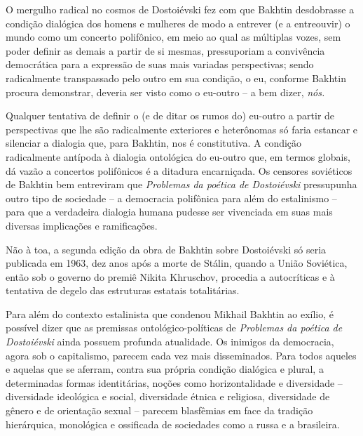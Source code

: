 O mergulho radical no cosmos de Dostoiévski fez com que Bakhtin
desdobrasse a condição dialógica dos homens e mulheres de modo a
entrever (e a entreouvir) o mundo como um concerto polifônico, em meio
ao qual as múltiplas vozes, sem poder definir as demais a partir de si
mesmas, pressuporiam a convivência democrática para a expressão de suas
mais variadas perspectivas; sendo radicalmente transpassado pelo outro
em sua condição, o eu, conforme Bakhtin procura demonstrar, deveria ser
visto como o eu-outro -- a bem dizer, \emph{nós.}

Qualquer tentativa de definir o (e de ditar os rumos do) eu-outro a
partir de perspectivas que lhe são radicalmente exteriores e heterônomas
só faria estancar e silenciar a dialogia que, para Bakhtin, nos é
constitutiva. A condição radicalmente antípoda à dialogia ontológica do
eu-outro que, em termos globais, dá vazão a concertos polifônicos é a
ditadura encarniçada. Os censores soviéticos de Bakhtin bem entreviram
que \emph{Problemas da poética de Dostoiévski} pressupunha outro tipo de
sociedade -- a democracia polifônica para além do estalinismo -- para
que a verdadeira dialogia humana pudesse ser vivenciada em suas mais
diversas implicações e ramificações.

Não à toa, a segunda edição da obra de Bakhtin sobre Dostoiévski só
seria publicada em 1963, dez anos após a morte de Stálin, quando a União
Soviética, então sob o governo do premiê Nikita Khruschov, procedia a
autocríticas e à tentativa de degelo das estruturas estatais
totalitárias.

Para além do contexto estalinista que condenou Mikhail Bakhtin ao
exílio, é possível dizer que as premissas ontológico-políticas de
\emph{Problemas da poética de Dostoiévski} ainda possuem profunda
atualidade. Os inimigos da democracia, agora sob o capitalismo, parecem
cada vez mais disseminados. Para todos aqueles e aquelas que se aferram,
contra sua própria condição dialógica e plural, a determinadas formas
identitárias, noções como horizontalidade e diversidade -- diversidade
ideológica e social, diversidade étnica e religiosa, diversidade de
gênero e de orientação sexual -- parecem blasfêmias em face da tradição
hierárquica, monológica e ossificada de sociedades como a russa e a
brasileira.

